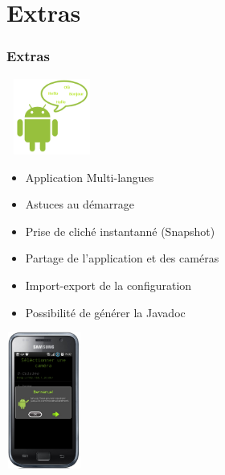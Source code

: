 \section{Extras}
\begin{frame}
\frametitle{Extras}
\includegraphics[width=3cm, height=2.5cm]{Images/ImageSlide11-3.png}\\
\begin{minipage}{0.69\textwidth}
\begin{itemize}
  \item Application Multi-langues
  \item Astuces au démarrage
  \item Prise de cliché instantanné (Snapshot)
  \item Partage de l'application et des caméras
  \item Import-export de la configuration
  \item Possibilité de générer la Javadoc 
\end{itemize}
\end{minipage}
\begin{minipage}{0.29\textwidth}
\includegraphics[width=2.5cm, height=4.5cm]{Images/ImageSlide11-3a.png}
\end{minipage}
\end{frame}